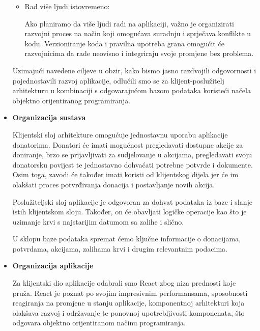 \documentclass[12pt]{article}
\begin{document}
\begin{itemize}
\begin{itemize}
	      	\item Rad više ljudi istovremeno:
	      	      	      	      
	      	      Ako planiramo da više ljudi radi na aplikaciji, važno je organizirati
	      	      razvojni proces na način koji omogućava suradnju i sprječava konflikte
	      	      u kodu. Verzioniranje koda i pravilna upotreba
	      	      grana omogućit će razvojnicima da rade neovisno i integriraju svoje
	      	      promjene bez problema.
	      \end{itemize}
	      	      
	      Uzimajući navedene ciljeve u obzir, kako bismo jasno razdvojili odgovornosti
	      i pojednostavili razvoj aplikacije, odlučili smo se za klijent-poslužitelj
	      arhitekturu u kombinaciji s odgovarajućom bazom podataka koristeći načela
	      objektno orijentiranog programiranja.
	      	      
	\item \textbf{Organizacija sustava}
	      	      
	      Klijentski sloj arhitekture omogućuje jednostavnu uporabu aplikacije donatorima.
	      Donatori će imati mogućnost pregledavati dostupne akcije za doniranje, brzo
	      se prijavljivati za sudjelovanje u akcijama, pregledavati svoju donatorsku
	      povijest te jednostavno dohvaćati potrebne potvrde i dokumente. Osim toga,
	      zavodi će također imati koristi od klijentskog dijela jer će im olakšati
	      proces potvrđivanja donacija i postavljanje novih akcija.
	      	      
	      Poslužiteljski sloj aplikacije je odgovoran za dohvat podataka iz baze i
	      slanje istih klijentskom sloju. Također, on će obavljati logičke operacije
	      kao što je uzimanje krvi s najstarijim datumom sa zalihe i slično.
	      	      
	      U sklopu baze podataka spremat ćemo ključne informacije o donacijama, potvrdama,
	      akcijama, zalihama krvi i drugim relevantnim podacima.
	      	      
	\item \textbf{Organizacija aplikacije}
	      	      
	      Za klijentski dio aplikacije odabrali smo React zbog niza prednosti koje pruža.
	      React je poznat po svojim impresivnim performansama, sposobnosti reagiranja
	      na promjene u stanju aplikacije, komponentnoj arhitekturi koja olakšava
	      razvoj i održavanje te ponovnoj upotrebljivosti komponenata, što odgovara objektno
	      orijentiranom načinu programiranja.
	      	      

\end{itemize}
\end{document}
